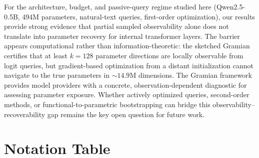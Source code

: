 \documentclass{article}
\begin{document}
For the architecture, budget, and passive-query regime studied here (Qwen2.5-0.5B, 494M parameters, natural-text queries, first-order optimization), our results provide strong evidence that partial sampled observability alone does not translate into parameter recovery for internal transformer layers.  The barrier appears computational rather than information-theoretic: the sketched Gramian certifies that at least $k{=}128$ parameter directions are locally observable from logit queries, but gradient-based optimization from a distant initialization cannot navigate to the true parameters in $\sim 14.9\text{M}$ dimensions.  The Gramian framework provides model providers with a concrete, observation-dependent diagnostic for assessing parameter exposure.  Whether actively optimized queries, second-order methods, or functional-to-parametric bootstrapping can bridge this observability--recoverability gap remains the key open question for future work.





\appendix

\section{Notation Table}
\label{app:notation}
\end{document}
